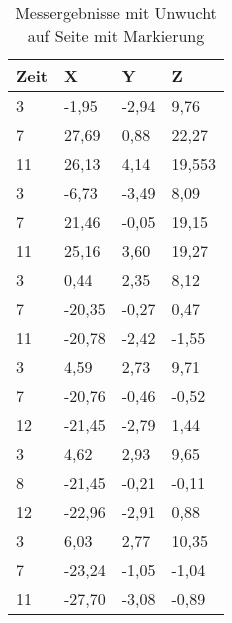 \begin{table}[H]
\centering
\begin{tabular}{llll}
\textbf{Zeit} & \textbf{X} & \textbf{Y } & \textbf{Z} \\
\hline
\hline
3    & -1,95  & -2,94 & 9,76   \\
7    & 27,69  & 0,88  & 22,27  \\
11   & 26,13  & 4,14  & 19,553 \\
\hline
3    & -6,73  & -3,49 & 8,09   \\
7    & 21,46  & -0,05 & 19,15  \\
11   & 25,16  & 3,60  & 19,27  \\
\hline
3    & 0,44   & 2,35  & 8,12   \\
7    & -20,35 & -0,27 & 0,47   \\
11   & -20,78 & -2,42 & -1,55  \\
\hline
3    & 4,59   & 2,73  & 9,71   \\
7    & -20,76 & -0,46 & -0,52  \\
12   & -21,45 & -2,79 & 1,44   \\
\hline
3    & 4,62   & 2,93  & 9,65   \\
8    & -21,45 & -0,21 & -0,11  \\
12   & -22,96 & -2,91 & 0,88   \\
\hline
3    & 6,03   & 2,77  & 10,35  \\
7    & -23,24 & -1,05 & -1,04  \\
11   & -27,70 & -3,08 & -0,89 
\end{tabular}
\caption{Messergebnisse mit Unwucht auf Seite mit Markierung}
\label{tab:imbalance_same_side-full}
\end{table}